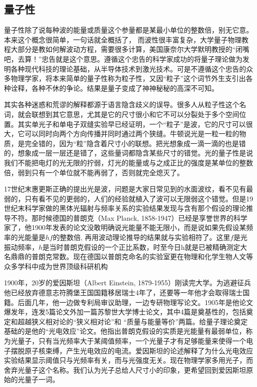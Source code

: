 \documentclass{ctexbook}
\begin{document}
\subsection{量子性}
量子性除了说每种波的能量或质量这个参量都是某最小单位的整数倍，别无它意。本来这个概念很简单，一句话就全概括了， 而波性很丰富复杂，大学量子物理教程大部分是教如何解波动方程，需要很多计算，美国康奈尔大学默明教授的“闭嘴吧，去算！”忠告就是这个意思。遵循这个忠告的科学家成功的将量子理论做为发明各种现代科技的理论基础，从半导体技术到激光技术。可是不遵循这个忠告的众多物理学家，将本来简单的量子性称为粒子性，又因“粒子”这个词节外生支引出各种诠释，各种不休的争论。结果是量子变成了神神秘秘的高深不可知。

其实各种迷惑和荒谬的解释都源于语言隐含歧义的误导。很多人从粒子性这个名词，就会联想到其它意思，尤其是它的尺寸很小和它不可以分裂处于多个空间位置。其实单光子和单电子双缝实验早已经证明，一个“粒子”是波，它的尺寸可以很大，它可以同时向两个方向传播并同时通过两个狭缝。牛顿说光是一粒一粒的物质，是完全错的，因为“粒”隐含着尺寸小的联想。把光想象成一滴一滴的也是错的，想象成一层一层还是错了，这些量词都隐含某些尺寸的错觉。光的量子性是说我们不能把电灯的光无限的拧弱，灯光的能量或与之成正比的强度是某单位的整数倍，弱到只有一个单位就不能再弱了，否则就完全熄灭了。

17世纪末惠更斯正确的提出光是波，问题是大家日常见到的水面波纹，看不见有最弱的，只有看不见的更弱的，人们的经验就植入了波可以无限弱这个错觉。但是19世纪末科学家做的黑体光辐射与频率关系的实验结果发现与含有那个假设的理论推导不符。那时候德国的普朗克（Max Planck, 1858-1947）已经是享誉世界的科学家了，他1900年发表的论文没敢明确说光能量不能无限小，而是说如果先假设某频率的光能量是$hf$的整数倍, 再用波动理论推导的结果就与实验相符了。这里$f$是光振动频率，$h$是当时普朗克假设的一个正比系数，时至今日h就是已被精确测定大名鼎鼎的普朗克常数。现在德国以普朗克命名的实验室更在物理和化学生物人文等众多学科中成为世界顶级科研机构

1900年，20岁的爱因斯坦（Albert Einstein, 1879-1955）刚读完大学。为逃避征兵他已经放弃德意志符腾堡王国国籍移居瑞士4年了，还要等一年他才会取得瑞士国籍。后面几年，他一边做专利局审议助理，一边专研物理写论文。1905年是他论文爆发年，连发5篇论文外加一篇苏黎世大学博士论文，其中4篇是奠基性的，包括奠定和超越狭义相对论的“狭义相对论”和 “质量与能量等价”两篇。给量子理论奠定基础的是他的“光电效应”论文。他指出普朗克假设的实质是光能量有最弱单位，称为光量子，只有当光频率大于某阈值频率，一个光量子才有足够能量来使得一个电子摆脱原子核束缚，产生光电效应的电流。爱因斯坦的论述解释了为什么光电效应实验结果显示阈值只与光频率有关，而与光强度无关。现在物理学家多用光子，而舍弃光量子这个名称。我们认为光子总给人尺寸小的印象，更希望回到爱因斯坦原始的光量子一词。
\end{document}
